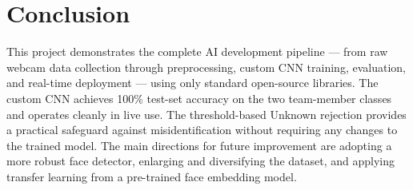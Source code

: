 \documentclass[12pt,a4paper]{article}
\begin{document}
\section{Conclusion}

This project demonstrates the complete AI development pipeline — from raw webcam data collection through preprocessing, custom CNN training, evaluation, and real-time deployment — using only standard open-source libraries. The custom CNN achieves 100\% test-set accuracy on the two team-member classes and operates cleanly in live use. The threshold-based Unknown rejection provides a practical safeguard against misidentification without requiring any changes to the trained model. The main directions for future improvement are adopting a more robust face detector, enlarging and diversifying the dataset, and applying transfer learning from a pre-trained face embedding model.
\end{document}
